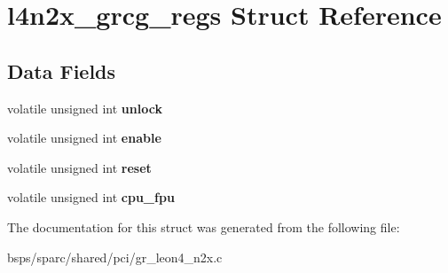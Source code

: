 \hypertarget{structl4n2x__grcg__regs}{}\section{l4n2x\+\_\+grcg\+\_\+regs Struct Reference}
\label{structl4n2x__grcg__regs}
\subsection*{Data Fields}
\begin{DoxyCompactItemize}
\item 
\mbox{\label{structl4n2x__grcg__regs_a57f07401902ed01c5eb00794e023d982}} 
volatile unsigned int {\bfseries unlock}
\item 
\mbox{\label{structl4n2x__grcg__regs_a163dbf8fbdf7e8531571aaf40700c419}} 
volatile unsigned int {\bfseries enable}
\item 
\mbox{\label{structl4n2x__grcg__regs_a2b129a8bb99646a94352ec1c78632933}} 
volatile unsigned int {\bfseries reset}
\item 
\mbox{\label{structl4n2x__grcg__regs_a37ad536540ccbd6a709f7dd8e944b9b3}} 
volatile unsigned int {\bfseries cpu\+\_\+fpu}
\end{DoxyCompactItemize}


The documentation for this struct was generated from the following file\+:\begin{DoxyCompactItemize}
\item 
bsps/sparc/shared/pci/gr\+\_\+leon4\+\_\+n2x.\+c\end{DoxyCompactItemize}
